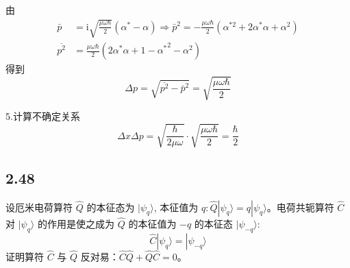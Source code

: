 由
\begin{equation}
    \begin{aligned}
        \bar{p}&=\mathrm{i}\sqrt{\frac{\mu \omega \hbar}{2}}\left( \alpha ^*-\alpha \right) \Rightarrow \bar{p}^2=-\frac{\mu \omega \hbar}{2}\left( \alpha ^{*2}+2\alpha ^*\alpha +\alpha ^2 \right) 
\\
\overline{p^2}&=\frac{\mu \omega \hbar}{2}\left( 2\alpha ^*\alpha +1-{\alpha ^*}^2-\alpha ^2 \right) 
    \end{aligned}
\end{equation}
得到
\begin{equation}
    \Delta p=\sqrt{\overline{p^2}-\bar{p}^2}=\sqrt{\frac{\mu \omega \hbar}{2}}
\end{equation}

5.计算不确定关系
\begin{equation}
    \Delta x\Delta p=\sqrt{\frac{\hbar}{2\mu \omega}}\cdot \sqrt{\frac{\mu \omega \hbar}{2}}=\frac{\hbar}{2}
\end{equation}

\subsection{2.48}
设厄米电荷算符 $\hat{Q}$ 的本征态为 $|\psi_q\rangle$, 本征值为 $q: \hat{Q} |\psi_q\rangle = q |\psi_q\rangle$。电荷共轭算符 $\hat{C}$ 对 $|\psi_q\rangle$ 的作用是使之成为 $\hat{Q}$ 的本征值为 $-q$ 的本征态 $|\psi_{-q}\rangle$:
$$\hat{C}|\psi_q\rangle = |\psi_{-q}\rangle$$
证明算符 $\hat{C}$ 与 $\hat{Q}$ 反对易：$\hat{C}\hat{Q}+\hat{Q}\hat{C}=0$。










